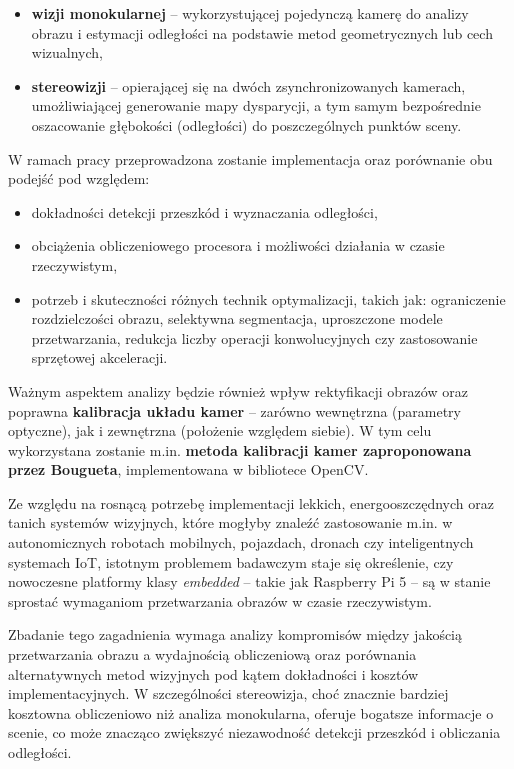 \documentclass[magisterska]{pracadypl}
\begin{document}
\begin{itemize}
  \item \textbf{wizji monokularnej} – wykorzystującej pojedynczą kamerę do analizy obrazu i estymacji odległości na podstawie metod geometrycznych lub cech wizualnych,
  \item \textbf{stereowizji} – opierającej się na dwóch zsynchronizowanych kamerach, umożliwiającej generowanie mapy dysparycji, a tym samym bezpośrednie oszacowanie głębokości (odległości) do poszczególnych punktów sceny.
\end{itemize}

W ramach pracy przeprowadzona zostanie implementacja oraz porównanie obu podejść pod względem:
\begin{itemize}
  \item dokładności detekcji przeszkód i wyznaczania odległości,
  \item obciążenia obliczeniowego procesora i możliwości działania w czasie rzeczywistym,
  \item potrzeb i skuteczności różnych technik optymalizacji, takich jak: ograniczenie rozdzielczości obrazu, selektywna segmentacja, uproszczone modele przetwarzania, redukcja liczby operacji konwolucyjnych czy zastosowanie sprzętowej akceleracji.
\end{itemize}

Ważnym aspektem analizy będzie również wpływ rektyfikacji obrazów oraz poprawna \textbf{kalibracja układu kamer} – zarówno wewnętrzna (parametry optyczne), jak i zewnętrzna (położenie względem siebie). W tym celu wykorzystana zostanie m.in. \textbf{metoda kalibracji kamer zaproponowana przez Bougueta}, implementowana w bibliotece OpenCV.

Ze względu na rosnącą potrzebę implementacji lekkich, energooszczędnych oraz tanich systemów wizyjnych, które mogłyby znaleźć zastosowanie m.in. w autonomicznych robotach mobilnych, pojazdach, dronach czy inteligentnych systemach IoT, istotnym problemem badawczym staje się określenie, czy nowoczesne platformy klasy \textit{embedded} – takie jak Raspberry Pi 5 – są w stanie sprostać wymaganiom przetwarzania obrazów w czasie rzeczywistym.

Zbadanie tego zagadnienia wymaga analizy kompromisów między jakością przetwarzania obrazu a wydajnością obliczeniową oraz porównania alternatywnych metod wizyjnych pod kątem dokładności i kosztów implementacyjnych. W szczególności stereowizja, choć znacznie bardziej kosztowna obliczeniowo niż analiza monokularna, oferuje bogatsze informacje o scenie, co może znacząco zwiększyć niezawodność detekcji przeszkód i obliczania odległości.
\end{document}
